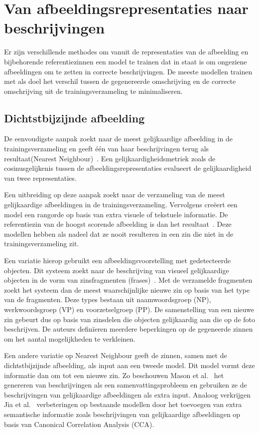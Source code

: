 \section{Van afbeeldingsrepresentaties naar beschrijvingen}
Er zijn verschillende methodes om vanuit de representaties van de afbeelding en bijbehorende referentiezinnen een model te trainen dat in staat is om ongeziene afbeeldingen om te zetten in correcte beschrijvingen. 
De meeste modellen trainen met als doel het verschil tussen de gegenereerde omschrijving en de correcte omschrijving uit de trainingsverzameling te minimaliseren.

\subsection{Dichtstbijzijnde afbeelding}
De eenvoudigste aanpak zoekt naar de meest gelijkaardige afbeelding in de trainingsverzameling en geeft \'e\'en van haar beschrijvingen terug als resultaat(Nearest Neighbour)~\cite{Devlin2015a}. Een gelijkaardigheidsmetriek zoals de cosinusgelijkenis tussen de afbeeldingsrepresentaties evalueert de gelijkaardigheid van twee representaties.

Een uitbreiding op deze aanpak zoekt naar de verzameling van de meest gelijkaardige afbeeldingen in de trainingsverzameling. Vervolgens cre\"eert een model een rangorde op basis van extra visuele of tekstuele informatie. De referentiezin van de hoogst scorende afbeelding is dan het resultaat~\cite{Devlin2015a,Hodosh2013,Oliva2006,Ordonez2011}. 
Deze modellen hebben als nadeel dat ze nooit resulteren in een zin die niet in de trainingsverzameling zit.

Een variatie hierop gebruikt een afbeeldingsvoorstelling met gedetecteerde objecten. Dit systeem zoekt naar de beschrijving van visueel gelijkaardige objecten in de vorm van zinsfragmenten (frases)~\cite{Gupta2012,Kuznetsova2012}. Met de verzamelde fragmenten zoekt het systeem dan de meest waarschijnlijke nieuwe zin op basis van het type van de fragmenten. Deze types bestaan uit naamwoordsgroep (NP), werkwoordsgroep (VP) en voorzetselgroep (PP). De samenstelling van een nieuwe zin gebeurt dus op basis van zinsdelen die objecten gelijkaardig aan die op de foto beschrijven. De auteurs defin\"ieren meerdere beperkingen op de gegeneerde zinnen om het aantal mogelijkheden te verkleinen.

Een andere variatie op Nearest Neighbour geeft de zinnen, samen met de dichtstbijzijnde afbeelding, als input aan een tweede model. Dit model vormt deze informatie dan om tot een nieuwe zin. Zo beschouwen Mason et al.~\cite{Mason2014} het genereren van beschrijvingen als een samenvattingsprobleem en gebruiken ze de beschrijvingen van gelijkaardige afbeeldingen als extra input. Analoog verkrijgen Jia et al.~\cite{Fernando2015} verbeteringen op bestaande modellen door het toevoegen van extra semantische informatie zoals beschrijvingen van gelijkaardige afbeeldingen op basis van Canonical Correlation Analysis (CCA).
 

